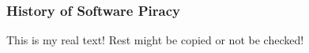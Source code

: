 \subsubsection{History of Software Piracy} \label{subsubsection:foundation-piracy-overview-history}
This is my real text! Rest might be copied or not be checked!
